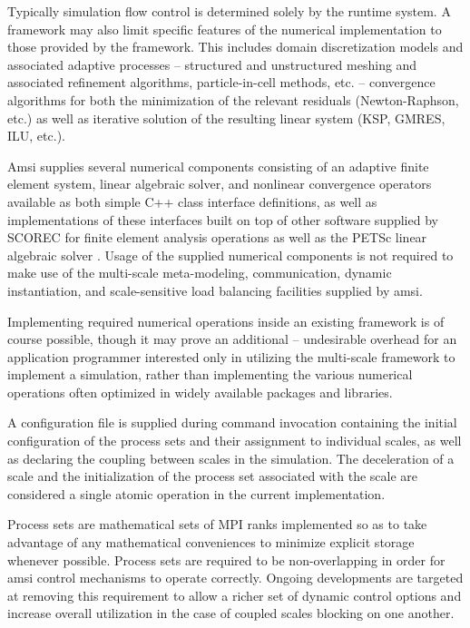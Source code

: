 \documentclass[11pt]{siamltex1213}
\begin{document}
Typically simulation flow control is determined solely by the runtime system. A framework may also limit specific features of the numerical implementation to those provided by the framework. This includes domain discretization models and associated adaptive processes -- structured and unstructured meshing and associated refinement algorithms, particle-in-cell methods, etc. -- convergence algorithms for both the minimization of the relevant residuals (Newton-Raphson, etc.) as well as iterative solution of the resulting linear system (KSP, GMRES, ILU, etc.). 

Amsi supplies several numerical components consisting of an adaptive finite element system, linear algebraic solver, and nonlinear convergence operators available as both simple C++ class interface definitions, as well as implementations of these interfaces built on top of other software supplied by SCOREC \cite{core} for finite element analysis operations as well as the PETSc linear algebraic solver \cite{petsc-web-page} \cite{petsc-user-ref} \cite{petsc-efficient}. Usage of the supplied numerical components is not required to make use of the multi-scale meta-modeling, communication, dynamic instantiation, and scale-sensitive load balancing facilities supplied by amsi.

Implementing required numerical operations inside an existing framework is of course possible, though it may prove an additional -- undesirable overhead for an application programmer interested only in utilizing the multi-scale framework to implement a simulation, rather than implementing the various numerical operations often optimized in widely available packages and libraries.

\label{amsi_scales}
A configuration file is supplied during command invocation containing the initial configuration of the process sets and their assignment to individual scales, as well as declaring the coupling between scales in the simulation. The deceleration of a scale and the initialization of the process set associated with the scale are considered a single atomic operation in the current implementation.

Process sets are mathematical sets of MPI ranks implemented so as to take advantage of any mathematical conveniences to minimize explicit storage whenever possible. Process sets are required to be non-overlapping in order for amsi control mechanisms to operate correctly. Ongoing developments are targeted at removing this requirement to allow a richer set of dynamic control options and increase overall utilization in the case of coupled scales blocking on one another. 
\end{document}
